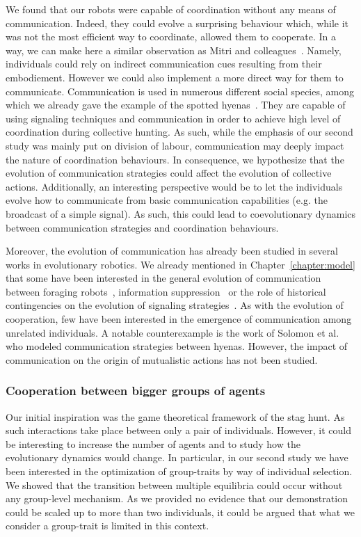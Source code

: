 			We found that our robots were capable of coordination without any means of communication. Indeed, they could evolve a surprising behaviour which, while it was not the most efficient way to coordinate, allowed them to cooperate. In a way, we can make here a similar observation as Mitri and colleagues~\parencite{Mitri2009}. Namely, individuals could rely on indirect communication cues resulting from their embodiement. However we could also implement a more direct way for them to communicate. Communication is used in numerous different social species, among which we already gave the example of the spotted hyenas~\parencite{Drea2009a, Smith2010, Smith2012a}. They are capable of using signaling techniques and communication in order to achieve high level of coordination during collective hunting. As such, while the emphasis of our second study was mainly put on division of labour, communication may deeply impact the nature of coordination behaviours. In consequence, we hypothesize that the evolution of communication strategies could affect the evolution of collective actions. Additionally, an interesting perspective would be to let the individuals evolve how to communicate from basic communication capabilities (e.g. the broadcast of a simple signal). As such, this could lead to coevolutionary dynamics between communication strategies and coordination behaviours.

			Moreover, the evolution of communication has already been studied in several works in evolutionary robotics. We already mentioned in Chapter~\ref{chapter:model} that some have been interested in the general evolution of communication between foraging robots~\parencite{Floreano2007}, information suppression~\parencite{Mitri2009} or the role of historical contingencies on the evolution of signaling strategies~\parencite{Wischmann2012}. As with the evolution of cooperation, few have been interested in the emergence of communication among unrelated individuals. A notable counterexample is the work of Solomon et al.~\parencite{Solomon2012} who modeled communication strategies between hyenas. However, the impact of communication on the origin of mutualistic actions has not been studied.


		\subsubsection{Cooperation between bigger groups of agents}

			Our initial inspiration was the game theoretical framework of the stag hunt. As such interactions take place between only a pair of individuals. However, it could be interesting to increase the number of agents and to study how the evolutionary dynamics would change. In particular, in our second study we have been interested in the optimization of group-traits by way of individual selection. We showed that the transition between multiple equilibria could occur without any group-level mechanism. As we provided no evidence that our demonstration could be scaled up to more than two individuals, it could be argued that what we consider a group-trait is limited in this context. 

